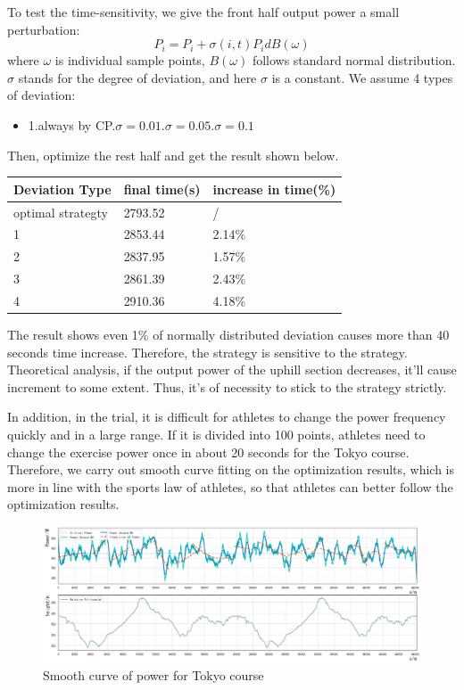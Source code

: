 \documentclass{mcmthesis}
\begin{document}
To test the time-sensitivity, we give the front half output power a small perturbation:
\begin{equation}
    P_i=P_i+\sigma(i,t)P_i dB(\omega)
\end{equation}
where $\omega$ is individual sample points, $B(\omega)$ follows standard normal distribution. $\sigma$ stands for the degree of deviation, and here $\sigma$ is a constant.
We assume 4 types of deviation:
\begin{itemize}
    \item 1.always by CP.$\sigma = 0.01$.$\sigma = 0.05$.$\sigma = 0.1$\\
\end{itemize}
Then, optimize the rest half and get the result shown below.
\begin{table}[H]
\centering
\begin{tabular}{lll}
\hline 
Deviation Type    & final time(s) & increase in time(\%)\\
\hline
optimal strategty & 2793.52   & /    \\
1                 & 2853.44    &  2.14\% \\
2                 & 2837.95 &  1.57\%\\
3                 & 2861.39  &    2.43\% \\
4                 & 2910.36   &  4.18\% \\
\hline
\end{tabular}
\end{table}
The result shows even 1\% of normally distributed deviation causes more than 40 seconds time increase. Therefore, the strategy is sensitive to the strategy. Theoretical analysis, if the output power of the uphill section decreases, it'll cause increment to some extent. Thus, it's of necessity to stick to the strategy strictly.
\par
In addition, in the trial, it is difficult for athletes to change the power frequency quickly and in a large range. If it is divided into 100 points, athletes need to change the exercise power once in about 20 seconds for the Tokyo course. Therefore, we carry out smooth curve fitting on the optimization results, which is more in line with the sports law of athletes, so that athletes can better follow the optimization results.
\begin{figure}[H]
\small
\centering
\includegraphics[width=13cm]{mcmthesis/figures/smooth.png}
\caption{Smooth curve of power for Tokyo course} 
\end{figure}
\end{document}
